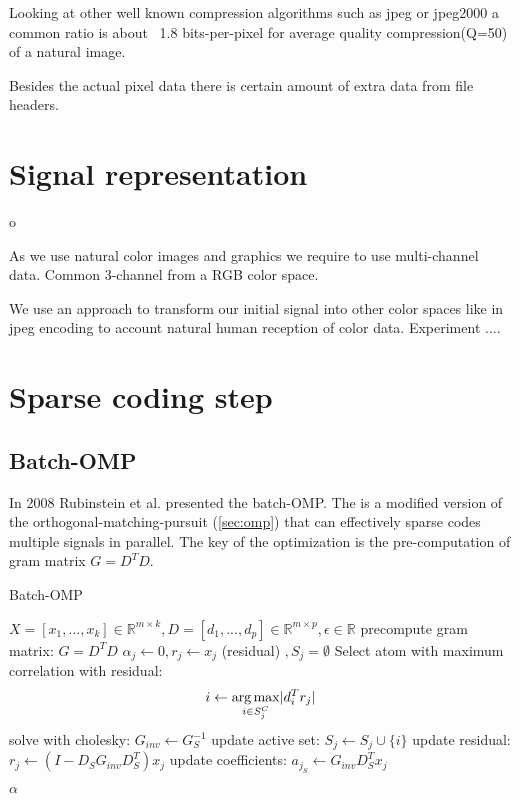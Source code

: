 Looking at other well known compression algorithms such as jpeg or jpeg2000 a common ratio is about ~1.8 bits-per-pixel for average quality compression(Q=50) of a natural image. 

Besides the actual pixel data there is certain amount of extra data from file headers. 


\section{Signal representation}o

As we use natural color images and graphics we require to use multi-channel data. Common 3-channel from a RGB color space.

We use an approach to transform our initial signal into other color spaces like in jpeg encoding to account natural human reception of
color data. 
Experiment ....


\section{Sparse coding step}
\subsection{Batch-OMP}
In 2008 Rubinstein et al. \cite{Rubinstein2008} presented the batch-OMP. 
The  is a modified version of the orthogonal-matching-pursuit (\ref{sec:omp}) 
that can effectively sparse codes multiple signals in parallel. 
The key of the optimization is the pre-computation of gram matrix $G=D^TD$.

\begin{algorithm}
\caption{Batch-OMP}
\label{alg:batchOMP}
\begin{algorithmic}[1]
\REQUIRE $X =[x_1,...,x_k]  \in \mathbb{R}^{m \times k}, D  =[d_1,...,d_p]  \in \mathbb{R}^{m\times p}, \epsilon \in \mathbb{R}$
\STATE precompute gram matrix: $G=D^TD$
\STATE $\alpha_j \gets 0, r_j \gets x_j $ (residual) $, S_j=\emptyset$
\STATE Select atom with maximum correlation with residual: 
\begin{equation*}
i \gets \operatorname*{arg\,max}_{i \in S_j^C} \lvert d_i^Tr_j \rvert
\end{equation*}
\STATE solve with cholesky: $G_{inv} \gets G_S^{-1}$
\STATE update active set: $S_j \gets S_j \cup \{i\} $
\STATE update residual: $r_j \gets \left(I-D_SG_{inv}D_S^T \right)x_j$
\STATE update coefficients: $a_{j_S} \gets G_{inv} D_S^T x_j $

\ENDFOR 
\ENDFOR 

\RETURN $\alpha$
\end{algorithmic}
\end{algorithm}

